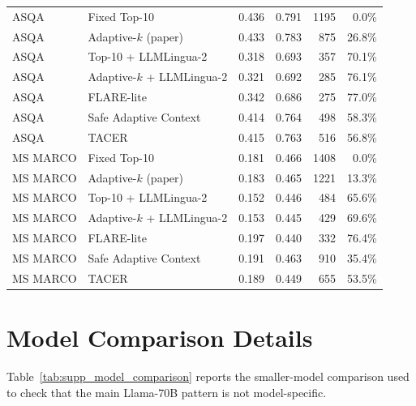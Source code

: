 \documentclass[11pt]{article}
\begin{document}
\begin{table}[!htbp]
{\begin{tabular}{llrrrr}
\midrule
ASQA & Fixed Top-10 & 0.436 & 0.791 & 1195 & 0.0\% \\
ASQA & Adaptive-$k$ (paper) & 0.433 & 0.783 & 875 & 26.8\% \\
ASQA & Top-10 + LLMLingua-2 & 0.318 & 0.693 & 357 & 70.1\% \\
ASQA & Adaptive-$k$ + LLMLingua-2 & 0.321 & 0.692 & 285 & 76.1\% \\
ASQA & FLARE-lite & 0.342 & 0.686 & 275 & 77.0\% \\
ASQA & Safe Adaptive Context & 0.414 & 0.764 & 498 & 58.3\% \\
ASQA & TACER & 0.415 & 0.763 & 516 & 56.8\% \\
\midrule
MS MARCO & Fixed Top-10 & 0.181 & 0.466 & 1408 & 0.0\% \\
MS MARCO & Adaptive-$k$ (paper) & 0.183 & 0.465 & 1221 & 13.3\% \\
MS MARCO & Top-10 + LLMLingua-2 & 0.152 & 0.446 & 484 & 65.6\% \\
MS MARCO & Adaptive-$k$ + LLMLingua-2 & 0.153 & 0.445 & 429 & 69.6\% \\
MS MARCO & FLARE-lite & 0.197 & 0.440 & 332 & 76.4\% \\
MS MARCO & Safe Adaptive Context & 0.191 & 0.463 & 910 & 35.4\% \\
MS MARCO & TACER & 0.189 & 0.449 & 655 & 53.5\% \\
\bottomrule
\end{tabular}%
}
\end{table}

\FloatBarrier

\section{Model Comparison Details}

Table~\ref{tab:supp_model_comparison} reports the smaller-model comparison used to check that the main Llama-70B pattern is not model-specific.
\end{document}
